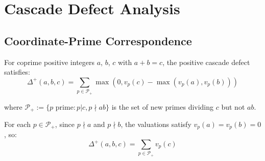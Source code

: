 \section{Cascade Defect Analysis}
\label{sec:cascade-defect-analysis}

\subsection{Coordinate-Prime Correspondence}
\label{subsec:coordinate-prime-correspondence}

\begin{theorem}
\label{thm:defect-equals-valuation-sum}

For coprime positive integers $a$, $b$, $c$ with $a + b = c$, the positive cascade defect satisfies:
\begin{equation}
\label{eq:defect-valuation-equality}
\Delta^+(a,b,c) = \sum_{p \in \mathcal{P}_+} \max(0, v_p(c) - \max(v_p(a), v_p(b)))
\end{equation}

where $\mathcal{P}_+ := \{p \text{ prime} : p | c, p \nmid ab\}$ is the set of new primes dividing $c$ but not $ab$.

For each $p \in \mathcal{P}_+$, since $p \nmid a$ and $p \nmid b$, the valuations satisfy $v_p(a) = v_p(b) = 0$, so:
\begin{equation}
\label{eq:new-prime-valuation}
\Delta^+(a,b,c) = \sum_{p \in \mathcal{P}_+} v_p(c)
\end{equation}

\end{theorem}

